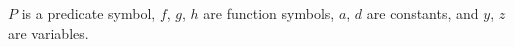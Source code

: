 $P$ is a predicate symbol, $f$, $g$, $h$ are function symbols, $a$, $d$ are constants, and $y$, $z$ are variables.

